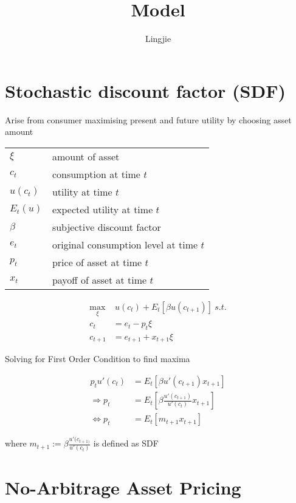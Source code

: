 \documentclass[11pt, oneside]{article}   	%
\title{Model}
\author{Lingjie}
\begin{document}
\maketitle

\section{Stochastic discount factor (SDF)}

Arise from consumer maximising present and future utility by choosing asset amount

\begin{tabular}{l @{ := } l}
    $\xi$ & amount of asset \\
    $c_t$ & consumption at time $t$ \\
    $u(c_t)$ & utility at time $t$ \\
    $E_t(u)$ & expected utility at time $t$ \\
    $\beta$ & subjective discount factor \\
    $e_t$ & original consumption level at time $t$ \\
    $p_t$ & price of asset at time $t$ \\
    $x_t$ & payoff of asset at time $t$
\end{tabular}

\begin{align*}
    \max_{\xi} & ~u(c_t) + E_t\left[ \beta u(c_{t+1}) \right]~s.t.\\
    c_t &= e_t - p_t\xi \\
    c_{t+1} &= e_{t+1} + x_{t+1}\xi
\end{align*}

Solving for First Order Condition to find maxima

\begin{align*}
    p_tu'(c_t) &= E_t\left[ \beta u'(c_{t+1}) x_{t+1}  \right]\\
    \Rightarrow p_t &= E_t\left[ \beta \frac{u'(c_{t+1})}{u'(c_t)} x_{t+1}  \right] \\
    \Leftrightarrow p_t &= E_t \left[ m_{t+1} x_{t+1}  \right]
\end{align*}

where $m_{t+1}:=\beta\frac{u'(c_{t+1)}}{u'(c_t)}$ is defined as SDF

\section{No-Arbitrage Asset Pricing}
\end{document}
